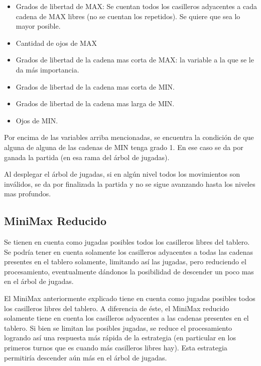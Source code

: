 \documentclass[11pt]{article}
\begin{document}
   \begin{itemize}
      \item Grados de libertad de MAX: Se cuentan todos los casilleros
        adyacentes a cada cadena de MAX libres (no se cuentan los
        repetidos). Se quiere que sea lo mayor posible.
      \item Cantidad de ojos de MAX
      \item Grados de libertad de la cadena mas corta de MAX: la
        variable a la que se le da m\'as importancia.
      \item Grados de libertad de la cadena mas corta de MIN.
      \item Grados de libertad de la cadena mas larga de MIN.
      \item Ojos de MIN.
   \end{itemize}
   
   Por encima de las variables arriba mencionadas, se encuentra la
   condici\'on de que alguna de alguna de las cadenas de MIN tenga
   grado 1. En ese caso se da por ganada la partida (en esa rama del
   \'arbol de jugadas).

   Al desplegar el \'arbol de jugadas, si en alg\'un nivel todos los
   movimientos son inv\'alidos, se da por finalizada la partida y no
   se sigue avanzando hasta los niveles mas profundos.

\subsection {MiniMax Reducido}
\label{sec-4.3.6}
Se tienen en cuenta como jugadas posibles todos los
       casilleros libres del tablero. Se podr\'ia tener en cuenta
       solamente los casilleros adyacentes a todas las cadenas
       presentes en el tablero solamente, limitando as\'i las jugadas,
       pero reduciendo el procesamiento, eventualmente d\'andonos la
       posibilidad de descender un poco mas en el \'arbol de jugadas.

El MiniMax anteriormente explicado tiene en cuenta como jugadas posibles todos los casilleros libres del tablero. 
A diferencia de \'este, el MiniMax reducido solamente tiene en cuenta los casilleros adyacentes a las cadenas presentes en el tablero.
Si bien se limitan las posibles jugadas, se reduce el procesamiento logrando as\'i una respuesta m\'as r\'apida de la estrategia
(en particular en los primeros turnos que es cuando m\'as casilleros libres hay). Esta estrategia permitir\'ia descender a\'un m\'as en el 
\'arbol de jugadas.
\end{document}
